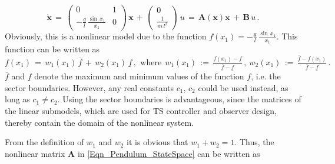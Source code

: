 \documentclass[a4paper]{article}
\newcommand{\xP}{\dot{x}}
\newcommand{\DS}{\displaystyle}
\newcommand{\Durch}[2]{\frac{\DS #1}{\DS #2}}
\newcommand{\B}[1]{\mathbf{#1}}
\newcommand{\fmax}{\overline{f}}
\newcommand{\fmin}{\underline{f}}
\begin{document}
\begin{equation}
\B{\xP} \, = \, \begin{pmatrix}0	& 1 \\ -\frac{g}{l}\,\frac{\sin\,x_1}{x_1} & 0 \end{pmatrix}\,\B{x} \, + \, \begin{pmatrix} 0 \\ \frac{1}{m\,l^2} \end{pmatrix} \, u \,
			= \, \B{A}\left(\B{x}\right) \B{x}\, + \, \B{B}\,u \, .
\label{Eqn_Pendulum_StateSpace}
\end{equation}
\newline Obviously, this is a nonlinear model due to the function $f\left(x_1\right) = -\frac{g}{l}\,\frac{\sin\,x_1}{x_1}$. This function can be written as
\newline \(	f\left(x_1\right) \, = \, w_1\left(x_1\right) \, \fmax \, + \, w_2\left(x_1\right) \, \fmin \, , 
			\:\, \text{where} \:\: w_1\left(x_1\right) \,:= \,\Durch{f\left(x_1\right) - \fmin}{\fmax - \fmin} \, ,
			\: w_2\left(x_1\right) \, := \, \Durch{\fmax - f\left(x_1\right)}{\fmax - \fmin} \,. \)
\newline $\fmax$ and $\fmin$ denote the maximum and minimum values of the function $f$, i.e. the sector boundaries. However, any real constants $c_1$, $c_2$ could be used instead, as long as $c_1 \neq c_2$. Using the sector boundaries is advantageous, since the matrices of the linear submodels, which are used for TS controller and observer design, thereby contain the domain of the nonlinear system.



From the definition of $w_1$ and $w_2$ it is obvious that $w_1 + w_2 = 1$. Thus, the nonlinear matrix $\B{A}$ in \eqref{Eqn_Pendulum_StateSpace} can be written as
\end{document}
